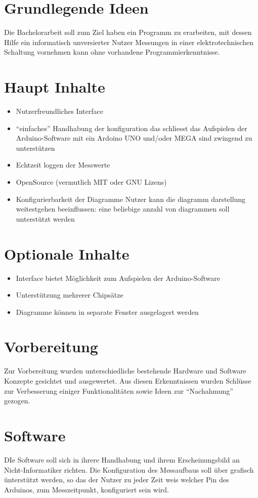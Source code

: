 \section{Grundlegende Ideen}
Die Bachelorarbeit soll zum Ziel haben ein Programm zu erarbeiten, mit dessen 
Hilfe ein informatisch unversierter Nutzer Messungen in einer
elektrotechnischen Schaltung vornehmen kann ohne vorhandene 
Programmierkenntnisse.

\section{Haupt Inhalte}
\begin{itemize}
 \item Nutzerfreundliches Interface
 \item ``einfaches'' Handhabung der konfiguration
  \subitem das schliesst das Aufspielen der Arduino-Software mit ein
  \subitem Ardoino UNO und/oder MEGA sind zwingend zu unterstützen
 \item Echtzeit loggen der Messwerte
 \item OpenSource (vermutlich MIT oder GNU Lizens)
 \item Konfigurierbarkeit der Diagramme
  \subitem Nutzer kann die diagramm darstellung weitestgehen beeinflussen:
    \subsubitem eine beliebige anzahl von diagrammen soll unterstützt werden
\end{itemize}

\section{Optionale Inhalte}
\begin{itemize}
 \item Interface bietet Möglichkeit zum Aufspielen der Arduino-Software
 \item Unterstützung mehrerer Chipsätze
 \item Diagramme können in separate Fenster ausgelagert werden
\end{itemize}

\section{Vorbereitung}
Zur Vorbereitung wurden unterschiedliche bestehende Hardware und Software 
Konzepte gesichtet und ausgewertet. Aus diesen Erkenntnissen wurden Schlüsse 
zur Verbesserung einiger Funktionalitäten sowie Ideen zur ``Nachahmung'' 
gezogen.

\section {Software}
DIe Software soll sich in ihrere Handhabung und ihrem Erscheinungsbild an 
Nicht-Informatiker richten. Die Konfiguration des Messaufbaus soll über 
grafisch ünterstützt werden, so das der Nutzer zu jeder Zeit weis welcher Pin 
des Arduinos, zum Messzeitpunkt, konfiguriert sein wird. 

